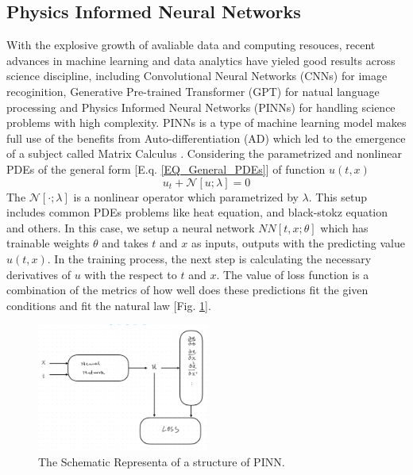 \subsection{Physics Informed Neural Networks}
With the explosive growth of avaliable data and computing resouces, 
recent advances in machine learning and data analytics have yieled good results across science discipline, 
including Convolutional Neural Networks (CNNs) \cite{CNN}
for image recoginition, 
Generative Pre-trained Transformer (GPT) \cite{GPT}
for natual language processing and 
Physics Informed Neural Networks (PINNs) \cite{PINN}
for handling science problems with high complexity.
PINNs is a type of machine learning model makes full use of the benefits from 
Auto-differentiation (AD) \cite{AD}
which led to the emergence of a subject called 
Matrix Calculus \cite{Matrix_Calculus}.
Considering the parametrized and nonlinear PDEs of the general form [E.q. \ref{EQ_General_PDEs}] of function $u(t,x)$
\begin{equation}\label{EQ_General_PDEs}
  u_t + \mathcal{N}\left[u;\lambda\right] = 0
\end{equation}
The $\mathcal{N}[\cdot;\lambda]$ is a nonlinear operator which parametrized by $\lambda$.
This setup includes common PDEs problems like heat equation, and black-stokz equation and others.
In this case, we setup a neural network $NN[t,x;\theta]$ which has trainable weights $\theta$ and takes 
$t$ and $x$ as inputs, outputs with the predicting value $\hat{u}(t,x)$.
In the training process, the next step is calculating the necessary derivatives of $u$ with the respect to $t$ and $x$.
The value of loss function is a combination of the metrics of how well does these predictions fit the given conditions and 
fit the natural law [Fig. \ref{FIG_Schematic_View_PINN}]. 
\begin{figure}[htbp]
  \centering
  \includegraphics[width=0.5\textwidth]{figure/FIG_Schematic_View_PINN.jpg}
  \caption{The Schematic Representa of a structure of PINN.}
  \label{FIG_Schematic_View_PINN}
\end{figure}

